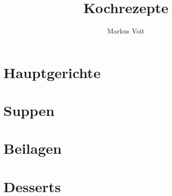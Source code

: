 \documentclass[DIV=11, pagesize, fontsize=11pt, paper=a4, numbers=noenddot]{scrartcl}
\title{Kochrezepte}
\author{Markus Voit}
\begin{document}
\maketitle

\tableofcontents
\clearpage

\section{Hauptgerichte}
\newpage{}
\newpage{}
\newpage{}
\newpage{}
\newpage{}
\newpage{}
\newpage{}
\newpage{}
\newpage{}
\newpage{}
\newpage{}
\newpage{}
\newpage{}
\newpage{}
\newpage{}
\newpage{}
\newpage{}
\newpage{}

\section{Suppen}
\newpage{}
\newpage{}

\section{Beilagen}
\newpage{}
\newpage{}
\newpage{}

\section{Desserts}
\newpage{}
\newpage{}
\newpage{}
\newpage{}
\newpage{}
\newpage{}
\end{document}
